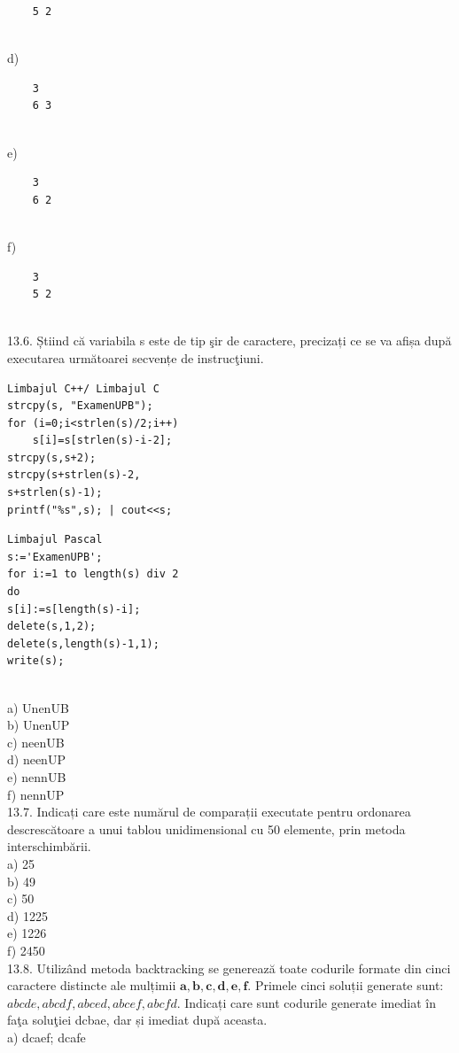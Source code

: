 {{\begin{verbatim}
    5 2
\end{verbatim}
\\
d) \begin{verbatim}
    3
    6 3
\end{verbatim}
\\
e) \begin{verbatim}
    3
    6 2
\end{verbatim}
\\
f) \begin{verbatim}
    3
    5 2
\end{verbatim}
\\
13.6. Ș̦tiind că variabila s este de tip şir de caractere, precizați ce se va afișa după executarea următoarei secvențe de instrucţiuni.
\begin{verbatim}
Limbajul C++/ Limbajul C
strcpy(s, "ExamenUPB");
for (i=0;i<strlen(s)/2;i++)
    s[i]=s[strlen(s)-i-2];
strcpy(s,s+2);
strcpy(s+strlen(s)-2,
s+strlen(s)-1);
printf("%s",s); | cout<<s;
\end{verbatim}
\begin{verbatim}
Limbajul Pascal
s:='ExamenUPB';
for i:=1 to length(s) div 2
do
s[i]:=s[length(s)-i];
delete(s,1,2);
delete(s,length(s)-1,1);
write(s);
\end{verbatim}
\\
a) UnenUB
\\
b) UnenUP
\\
c) neenUB
\\
d) neenUP
\\
e) nennUB
\\
f) nennUP
\\
13.7. Indicați care este numărul de comparații executate pentru ordonarea descrescătoare a unui tablou unidimensional cu 50 elemente, prin metoda interschimbării.
\\
a) 25
\\
b) 49
\\
c) 50
\\
d) 1225
\\
e) 1226
\\
f) 2450
\\
13.8. Utilizând metoda backtracking se generează toate codurile formate din cinci caractere distincte ale mulțimii ${\mathbf{a}, \mathbf{b}, \mathbf{c}, \mathbf{d}, \mathbf{e}, \mathbf{f}}$. Primele cinci soluții generate sunt: $a b c d e, a b c d f, a b c e d, a b c e f, a b c f d$. Indicați care sunt codurile generate imediat în faţa soluţiei dcbae, dar și imediat după aceasta.
\\
a) dcaef; dcafe
}}

